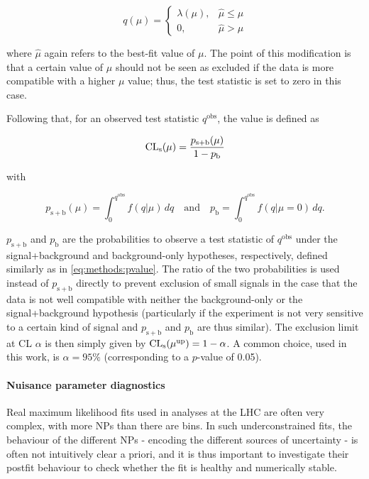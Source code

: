 \begin{equation}
    q(\mu) = \begin{cases} 
        \lambda(\mu), & \hat{\mu} \leq \mu \\
        0, & \hat{\mu} > \mu
    \end{cases}
\end{equation}

\noindent where $\hat{\mu}$ again refers to the best-fit value of $\mu$. The point of this modification is that a certain value of $\mu$ should not be seen as excluded if the data is more compatible with a higher $\mu$ value; thus, the test statistic is set to zero in this case.

Following that, for an observed test statistic $q^{\mathrm{obs}}$, the \CLs value is defined as

\begin{equation}
\label{eq:methods:cls}
    \mathrm{CL}_{\mathrm{s}} (\mu) = \frac { p_{\mathrm{s+b}} (\mu) } { 1 - p_{\mathrm{b}} }
\end{equation}

\noindent with

\begin{equation}
    p_{\mathrm{s+b}} (\mu) = \int_0^{q^{\mathrm{obs}}} f(q | \mu) \, dq
    \quad \text{and} \quad
    p_{\mathrm{b}} = \int_0^{q^{\mathrm{obs}}} f(q | \mu = 0) \, dq.
\end{equation}

$p_{\mathrm{s+b}}$ and $p_{\mathrm{b}}$ are the probabilities to observe a test statistic of $q^{\mathrm{obs}}$ under the signal+background and background-only hypotheses, respectively, defined similarly as in \cref{eq:methods:pvalue}. The ratio of the two probabilities is used instead of $p_{\mathrm{s+b}}$ directly to prevent exclusion of small signals in the case that the data is not well compatible with neither the background-only or the signal+background hypothesis (particularly if the experiment is not very sensitive to a certain kind of signal and $p_{\mathrm{s+b}}$ and $p_{\mathrm{b}}$ are thus similar). The exclusion limit at CL $\alpha$ is then simply given by $\mathrm{CL}_{\mathrm{s}} (\mu^{\mathrm{up}}) = 1 - \alpha$. A common choice, used in this work, is $\alpha = 95\%$ (corresponding to a $p$-value of 0.05).

\paragraph{Nuisance parameter diagnostics}

Real maximum likelihood fits used in analyses at the LHC are often very complex, with more NPs than there are bins. In such underconstrained fits, the behaviour of the different NPs - encoding the different sources of uncertainty - is often not intuitively clear a priori, and it is thus important to investigate their postfit behaviour to check whether the fit is healthy and numerically stable.

